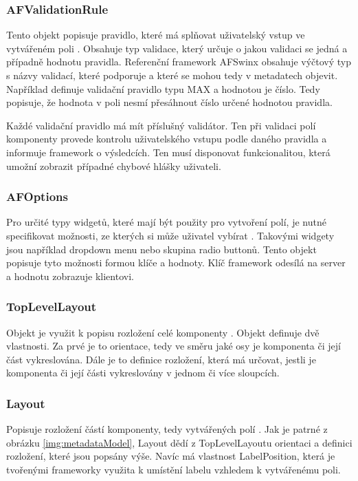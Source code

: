 \subsubsection{AFValidationRule}
Tento objekt popisuje pravidlo, které má splňovat uživatelský vstup ve vytvářeném poli \cite{tomasek-thesis}. Obsahuje typ validace, který určuje o jakou validaci se jedná a případně hodnotu pravidla. Referenční framework AFSwinx obsahuje výčtový typ s názvy validací, které podporuje a které se mohou tedy v metadatech objevit. Například definuje validační pravidlo typu MAX a hodnotou je číslo. Tedy popisuje, že hodnota v poli nesmí přesáhnout číslo určené hodnotou pravidla. 

Každé validační pravidlo má mít příslušný validátor. Ten při validaci polí komponenty provede kontrolu uživatelského vstupu podle daného pravidla a informuje framework o výsledcích. Ten musí disponovat funkcionalitou, která umožní zobrazit případné chybové hlášky uživateli. 

\subsubsection{AFOptions}
Pro určité typy widgetů, které mají být použity pro vytvoření polí, je nutné specifikovat možnosti, ze kterých si může uživatel vybírat \cite{tomasek-thesis}. Takovými widgety jsou například dropdown menu nebo skupina radio buttonů. Tento objekt popisuje tyto možnosti formou klíče a hodnoty. Klíč framework odesílá na server a hodnotu zobrazuje klientovi.

\subsubsection{TopLevelLayout}
Objekt je využit k popisu rozložení celé komponenty \cite{tomasek-thesis}. Objekt definuje dvě vlastnosti. Za prvé je to orientace, tedy ve směru jaké osy je komponenta či její část vykreslována. Dále je to definice rozložení, která má určovat, jestli je komponenta či její části vykreslovány v jednom či více sloupcích. 

\subsubsection{Layout}
Popisuje rozložení částí komponenty, tedy vytvářených polí \cite{tomasek-thesis}. Jak je patrné z obrázku \ref{img:metadataModel}, Layout dědí z TopLevelLayoutu orientaci a definici rozložení, které jsou popsány výše. Navíc má vlastnost LabelPosition, která je tvořenými frameworky využita k umístění labelu vzhledem k vytvářenému poli.

